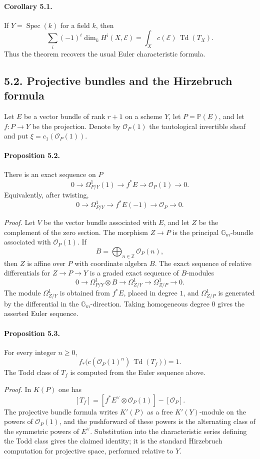 \documentclass[12pt]{article}
\newcommand{\ZZ}{\mathbb Z}
\newcommand{\GG}{\mathbb G}
\newcommand{\bP}{\mathbb P}
\newcommand{\cO}{\mathcal O}
\newcommand{\cE}{\mathcal E}
\newcommand{\Spec}{\operatorname{Spec}}
\newcommand{\Todd}{\operatorname{Td}}
\newcommand{\longto}{\longrightarrow}
\begin{document}
\paragraph{Corollary 5.1.}
If $Y=\Spec(k)$ for a field $k$, then
\[
 \sum_i(-1)^i\dim_k H^i(X,\cE)=\int_X c(\cE)\,\Todd(T_X).
\]
Thus the theorem recovers the usual Euler characteristic formula.

\subsection*{5.2. Projective bundles and the Hirzebruch formula}

Let $E$ be a vector bundle of rank $r+1$ on a scheme $Y$, let $P=\bP(E)$, and let $f:P\to Y$ be the projection. Denote by $\cO_P(1)$ the tautological invertible sheaf and put $\xi=c_1(\cO_P(1))$.

\paragraph{Proposition 5.2.}
There is an exact sequence on $P$
\[
0\longto \Omega^1_{P/Y}(1)\longto f^*E\longto \cO_P(1)\longto0.
\]
Equivalently, after twisting,
\[
0\longto \Omega^1_{P/Y}\longto f^*E(-1)\longto \cO_P\longto0.
\]

\emph{Proof.}
Let $V$ be the vector bundle associated with $E$, and let $Z$ be the complement of the zero section. The morphism $Z\to P$ is the principal $\GG_m$-bundle associated with $\cO_P(1)$. If
\[
B=\bigoplus_{n\in\ZZ}\cO_P(n),
\]
then $Z$ is affine over $P$ with coordinate algebra $B$. The exact sequence of relative differentials for $Z\to P\to Y$ is a graded exact sequence of $B$-modules
\[
0\longto \Omega^1_{P/Y}\otimes B\longto \Omega^1_{Z/Y}\longto \Omega^1_{Z/P}\longto0.
\]
The module $\Omega^1_{Z/Y}$ is obtained from $f^*E$, placed in degree $1$, and $\Omega^1_{Z/P}$ is generated by the differential in the $\GG_m$-direction. Taking homogeneous degree $0$ gives the asserted Euler sequence.

\paragraph{Proposition 5.3.}
For every integer $n\geq0$,
\[
 f_*\bigl(c(\cO_P(1)^n)\,\Todd(T_f)\bigr)=1.
\]
The Todd class of $T_f$ is computed from the Euler sequence above.

\emph{Proof.}
In $K(P)$ one has
\[
[T_f]=[f^*E^\vee\otimes \cO_P(1)]-[\cO_P].
\]
The projective bundle formula writes $K'(P)$ as a free $K'(Y)$-module on the powers of $\cO_P(1)$, and the pushforward of these powers is the alternating class of the symmetric powers of $E^\vee$. Substitution into the characteristic series defining the Todd class gives the claimed identity; it is the standard Hirzebruch computation for projective space, performed relative to $Y$.
\end{document}
